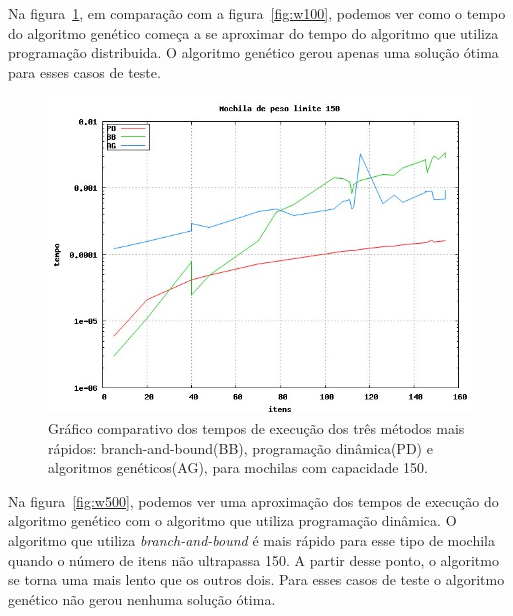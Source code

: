 Na figura~\ref{fig:w150}, em comparação com a figura~\ref{fig:w100}, podemos ver como o tempo do algoritmo genético começa a se aproximar do tempo do algoritmo que utiliza programação distribuida. O algoritmo genético gerou apenas uma solução ótima para esses casos de teste.

\begin{figure}[htp]
	\centering
	\includegraphics[scale=0.4]{images/w150.jpg}
	\caption{Gráfico comparativo dos tempos de execução dos três métodos mais rápidos: branch-and-bound(BB), programação dinâmica(PD) e algoritmos genéticos(AG), para mochilas com capacidade 150.}
	\label{fig:w150}
\end{figure}

Na figura~\ref{fig:w500}, podemos ver uma aproximação dos tempos de execução do algoritmo genético com o algoritmo que utiliza programação dinâmica. O algoritmo que utiliza \textit{branch-and-bound} é mais rápido para esse tipo de mochila quando o número de itens não ultrapassa 150. A partir desse ponto, o algoritmo se torna uma mais lento que os outros dois. Para esses casos de teste o algoritmo genético não gerou nenhuma solução ótima.

